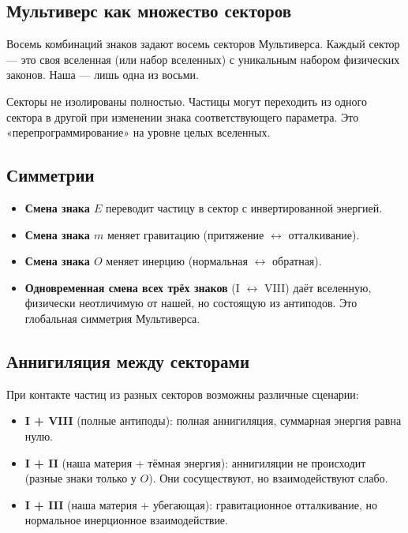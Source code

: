 \documentclass[12pt,a4paper]{article}
\begin{document}
\subsection{Мультиверс как множество секторов}
Восемь комбинаций знаков задают восемь секторов Мультиверса. Каждый сектор --- это своя вселенная (или набор вселенных) с уникальным набором физических законов. Наша --- лишь одна из восьми.

Секторы не изолированы полностью. Частицы могут переходить из одного сектора в другой при изменении знака соответствующего параметра. Это «перепрограммирование» на уровне целых вселенных.

\subsection{Симметрии}
\begin{itemize}
    \item \textbf{Смена знака $E$} переводит частицу в сектор с инвертированной энергией.
    \item \textbf{Смена знака $m$} меняет гравитацию (притяжение $\leftrightarrow$ отталкивание).
    \item \textbf{Смена знака $O$} меняет инерцию (нормальная $\leftrightarrow$ обратная).
    \item \textbf{Одновременная смена всех трёх знаков} (I $\leftrightarrow$ VIII) даёт вселенную, физически неотличимую от нашей, но состоящую из антиподов. Это глобальная симметрия Мультиверса.
\end{itemize}

\subsection{Аннигиляция между секторами}
При контакте частиц из разных секторов возможны различные сценарии:
\begin{itemize}
    \item \textbf{I + VIII} (полные антиподы): полная аннигиляция, суммарная энергия равна нулю.
    \item \textbf{I + II} (наша материя + тёмная энергия): аннигиляции не происходит (разные знаки только у $O$). Они сосуществуют, но взаимодействуют слабо.
    \item \textbf{I + III} (наша материя + убегающая): гравитационное отталкивание, но нормальное инерционное взаимодействие.
\end{itemize}
\end{document}
